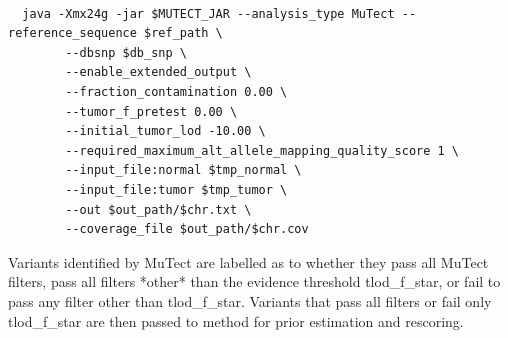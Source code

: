 \documentclass[a4,center,fleqn]{NAR}
\begin{document}
\begin{tiny}
\begin{verbatim}

  java -Xmx24g -jar $MUTECT_JAR --analysis_type MuTect --reference_sequence $ref_path \
        --dbsnp $db_snp \
        --enable_extended_output \
        --fraction_contamination 0.00 \
        --tumor_f_pretest 0.00 \
        --initial_tumor_lod -10.00 \
        --required_maximum_alt_allele_mapping_quality_score 1 \
        --input_file:normal $tmp_normal \
        --input_file:tumor $tmp_tumor \
        --out $out_path/$chr.txt \
        --coverage_file $out_path/$chr.cov

\end{verbatim}
\end{tiny}
Variants identified by MuTect are labelled as to whether they pass all MuTect filters, pass all filters *other* than the evidence threshold \textrm{tlod\_f\_star}, or fail to pass any filter other than \textrm{tlod\_f\_star}. Variants that pass all filters or fail only \textrm{tlod\_f\_star} are then passed to {method} for prior estimation and rescoring.
\end{document}
